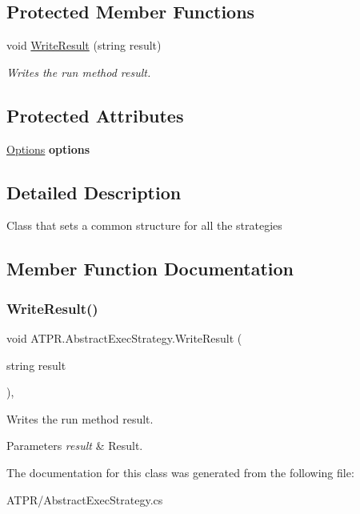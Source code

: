 \subsection*{Protected Member Functions}
\begin{DoxyCompactItemize}
\item 
void \hyperlink{class_a_t_p_r_1_1_abstract_exec_strategy_a5c7e5c801d158537a2f315bcb5ed91b8}{Write\+Result} (string result)
\begin{DoxyCompactList}\small\item\em Writes the run method result. \end{DoxyCompactList}\end{DoxyCompactItemize}
\subsection*{Protected Attributes}
\begin{DoxyCompactItemize}
\item 
\hypertarget{class_a_t_p_r_1_1_abstract_exec_strategy_aa6db79825edd147d1e98ffe52f18335f}{}\label{class_a_t_p_r_1_1_abstract_exec_strategy_aa6db79825edd147d1e98ffe52f18335f} 
\hyperlink{class_a_t_p_r_1_1_options}{Options} {\bfseries options}
\end{DoxyCompactItemize}


\subsection{Detailed Description}
Class that sets a common structure for all the strategies 



\subsection{Member Function Documentation}
\hypertarget{class_a_t_p_r_1_1_abstract_exec_strategy_a5c7e5c801d158537a2f315bcb5ed91b8}{}\label{class_a_t_p_r_1_1_abstract_exec_strategy_a5c7e5c801d158537a2f315bcb5ed91b8} 
\subsubsection{\texorpdfstring{Write\+Result()}{WriteResult()}}
{\footnotesize\ttfamily void A\+T\+P\+R.\+Abstract\+Exec\+Strategy.\+Write\+Result (\begin{DoxyParamCaption}\item[{string}]{result }\end{DoxyParamCaption})\hspace{0.3cm}{\ttfamily [inline]}, {\ttfamily [protected]}}



Writes the run method result. 


\begin{DoxyParams}{Parameters}
{\em result} & Result.\\
\hline
\end{DoxyParams}


The documentation for this class was generated from the following file\+:\begin{DoxyCompactItemize}
\item 
A\+T\+P\+R/Abstract\+Exec\+Strategy.\+cs\end{DoxyCompactItemize}
